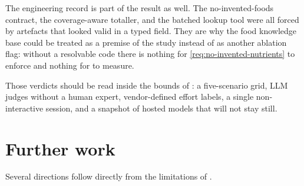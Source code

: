 The engineering record is part of the result as well. The no-invented-foods contract, the coverage-aware totaller, and the batched lookup tool were all forced by artefacts that looked valid in a typed field. They are why the food knowledge base could be treated as a premise of the study instead of as another ablation flag: without a resolvable code there is nothing for \ref{req:no-invented-nutrients} to enforce and nothing for  to measure.

Those verdicts should be read inside the bounds of : a five-scenario grid, LLM judges without a human expert, vendor-defined effort labels, a single non-interactive session, and a snapshot of hosted models that will not stay still.

\section{Further work}
\label{sec:conclusions-future-work}

Several directions follow directly from the limitations of .

